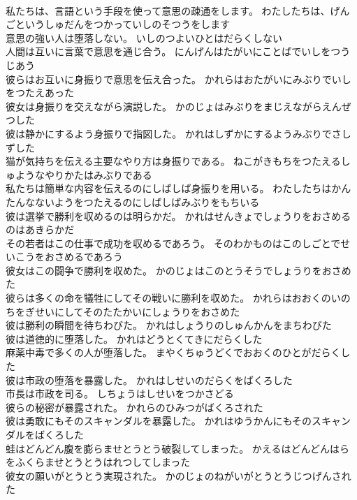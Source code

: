 \documentclass[8pt]{extreport}
\begin{document}
\begin{CJK}{UTF8}{min}
\\	私たちは、言語という手段を使って意思の疎通をします。	わたしたちは、げんごというしゅだんをつかっていしのそつうをします 
\\	意思の強い人は堕落しない。	いしのつよいひとはだらくしない 
\\	人間は互いに言葉で意思を通じ合う。	にんげんはたがいにことばでいしをつうじあう 
\\	彼らはお互いに身振りで意思を伝え合った。	かれらはおたがいにみぶりでいしをつたえあった 
\\	彼女は身振りを交えながら演説した。	かのじょはみぶりをまじえながらえんぜつした 
\\	彼は静かにするよう身振りで指図した。	かれはしずかにするようみぶりでさしずした 
\\	猫が気持ちを伝える主要なやり方は身振りである。	ねこがきもちをつたえるしゅようなやりかたはみぶりである 
\\	私たちは簡単な内容を伝えるのにしばしば身振りを用いる。	わたしたちはかんたんなないようをつたえるのにしばしばみぶりをもちいる 
\\	彼は選挙で勝利を収めるのは明らかだ。	かれはせんきょでしょうりをおさめるのはあきらかだ 
\\	その若者はこの仕事で成功を収めるであろう。	そのわかものはこのしごとでせいこうをおさめるであろう 
\\	彼女はこの闘争で勝利を収めた。	かのじょはこのとうそうでしょうりをおさめた 
\\	彼らは多くの命を犠牲にしてその戦いに勝利を収めた。	かれらはおおくのいのちをぎせいにしてそのたたかいにしょうりをおさめた 
\\	彼は勝利の瞬間を待ちわびた。	かれはしょうりのしゅんかんをまちわびた 
\\	彼は道徳的に堕落した。	かれはどうとくてきにだらくした 
\\	麻薬中毒で多くの人が堕落した。	まやくちゅうどくでおおくのひとがだらくした 
\\	彼は市政の堕落を暴露した。	かれはしせいのだらくをばくろした 
\\	市長は市政を司る。	しちょうはしせいをつかさどる 
\\	彼らの秘密が暴露された。	かれらのひみつがばくろされた 
\\	彼は勇敢にもそのスキャンダルを暴露した。	かれはゆうかんにもそのスキャンダルをばくろした 
\\	蛙はどんどん腹を膨らませとうとう破裂してしまった。	かえるはどんどんはらをふくらませとうとうはれつしてしまった 
\\	彼女の願いがとうとう実現された。	かのじょのねがいがとうとうじつげんされた 

\end{CJK}
\end{document}
